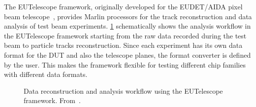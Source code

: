 The EUTelescope framework, originally developed for the EUDET/AIDA
pixel beam telescope~\cite{Rubinskiy:2014kza}, provides Marlin
processors for the track reconstruction and data analysis of test beam
experiments. \cref{fig:EUTelescope_EUDET_pipeline} schematically shows
the analysis workflow in the EUTelescope framework starting from the
raw data recorded during the test beam to particle tracks
reconstruction. Since each experiment has its own data format for the
DUT and also the telescope planes, the format converter is defined by
the user. This makes the framework flexible for testing different chip
families with different data formats.

\begin{figure}[htbp]
  \centering
  \caption{Data reconstruction and analysis workflow using the
    EUTelescope framework. From~\cite{Jansen:2016bkd}.}
  \label{fig:EUTelescope_EUDET_pipeline}
\end{figure}

